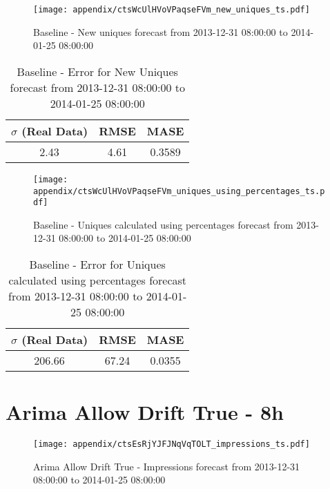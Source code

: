 \begin{figure}[H] \begin{center} \leavevmode
\texttt{[image: appendix/ctsWcUlHVoVPaqseFVm\_new\_uniques\_ts.pdf]} \caption{
Baseline - New uniques forecast from 2013-12-31 08:00:00 to 2014-01-25 08:00:00} \label{fig:appendix/ctsWcUlHVoVPaqseFVm_new_uniques_ts.pdf} \end{center}
\end{figure}

\begin{table}[H]
\centering
\footnotesize
\begin{tabular}{ccc}
$\sigma$ (Real Data) & RMSE & MASE   \\ \hline
2.43 & 4.61 & 0.3589 \\
\end{tabular}

\vspace{0.5cm}

\caption{
Baseline - Error for New Uniques forecast from 2013-12-31 08:00:00 to 2014-01-25 08:00:00}
\end{table}

\begin{figure}[H] \begin{center} \leavevmode
\texttt{[image: appendix/ctsWcUlHVoVPaqseFVm\_uniques\_using\_percentages\_ts.pdf]} \caption{
Baseline - Uniques calculated using percentages forecast from 2013-12-31 08:00:00 to 2014-01-25 08:00:00} \label{fig:appendix/ctsWcUlHVoVPaqseFVm_uniques_using_percentages_ts.pdf} \end{center}
\end{figure}

\begin{table}[H]
\centering
\footnotesize
\begin{tabular}{ccc}
$\sigma$ (Real Data) & RMSE & MASE   \\ \hline
206.66 & 67.24 & 0.0355 \\
\end{tabular}

\vspace{0.5cm}

\caption{
Baseline - Error for Uniques calculated using percentages forecast from 2013-12-31 08:00:00 to 2014-01-25 08:00:00}
\end{table}

\section{Arima Allow Drift True - 8h}
\begin{figure}[H] \begin{center} \leavevmode
\texttt{[image: appendix/ctsEsRjYJFJNqVqTOLT\_impressions\_ts.pdf]} \caption{
Arima Allow Drift True - Impressions forecast from 2013-12-31 08:00:00 to 2014-01-25 08:00:00} \label{fig:appendix/ctsEsRjYJFJNqVqTOLT_impressions_ts.pdf} \end{center}
\end{figure}

